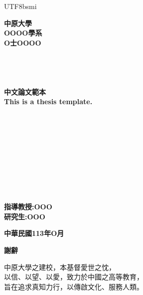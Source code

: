 \documentclass[12pt,a4paper]{article}
\begin{document}
\begin{CJK*}{UTF8}{bsmi} %
\sectionfont{\centering}
\begin{center}
    \textbf{\fontsize{24}{32}\selectfont 中原大學}\\
    \textbf{\fontsize{24}{32}\selectfont OOOO學系}\\
    \textbf{\fontsize{24}{32}\selectfont O士OOOO}\\
    \textbf{} \\
    \textbf{} \\
    \textbf{} \\ 
    \textbf{} \\
    \textbf{\fontsize{18}{21.6}\selectfont 中文論文範本}\\
    \textbf{\fontsize{18}{21.6}\selectfont This is a thesis template.}\\
    \textbf{} \\
    \textbf{} \\
\end{center}
\begin{center}
    \textbf{} \\
    \textbf{} \\
    \textbf{} \\
    \textbf{} \\
    \textbf{} \\
    \textbf{} \\
    \textbf{} \\
    \textbf{\fontsize{24}{32}\selectfont 指導教授:OOO} \\
    \textbf{\fontsize{24}{32}\selectfont 研究生:OOO} \\
\end{center}
\vfill
\begin{center}
    \textbf{\fontsize{24}{21.6}\selectfont 中華民國113年O月}
\end{center}
\thispagestyle{empty}
\clearpage




\begin{center}
    \textbf{\fontsize{18}{21.6}\selectfont 謝辭} \\
\end{center}
中原大學之建校，本基督愛世之忱，\\
以信、以望、以愛，致力於中國之高等教育，\\
旨在追求真知力行，以傳啟文化、服務人類。
\clearpage

\renewcommand{\contentsname}{目錄} %
\tableofcontents
\clearpage

\renewcommand{\listfigurename}{圖目錄}
\listoffigures
{}
\clearpage

\renewcommand{\listtablename}{表目錄}
\listoftables
\clearpage






\end{CJK*}
\end{document}
